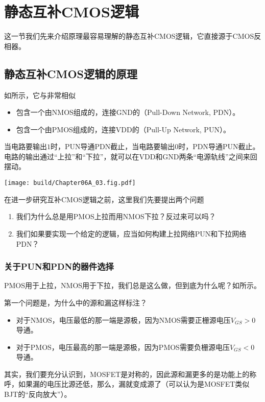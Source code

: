 \section{静态互补CMOS逻辑}
这一节我们先来介绍原理最容易理解的静态互补CMOS逻辑，它直接源于CMOS反相器。

\subsection{静态互补CMOS逻辑的原理}
如所示，它与非常相似
\begin{itemize}
    \item 包含一个由NMOS组成的，连接GND的（Pull-Down Network, PDN）。
    \item 包含一个由PMOS组成的，连接VDD的（Pull-Up Network, PUN）。
\end{itemize}
当电路要输出$1$时，PUN导通PDN截止，当电路要输出$0$时，PDN导通PUN截止。电路的输出通过“上拉”和“下拉”，就可以在VDD和GND两条“电源轨线”之间来回摆动。

\begin{Figure}[静态互补CMOS逻辑]
    \texttt{[image: build/Chapter06A\_03.fig.pdf]}
\end{Figure}


在进一步研究互补CMOS逻辑之前，这里我们先要提出两个问题
\begin{enumerate}
    \item 我们为什么总是用PMOS上拉而用NMOS下拉？反过来可以吗？
    \item 我们如果要实现一个给定的逻辑，应当如何构建上拉网络PUN和下拉网络PDN？
\end{enumerate}

\subsubsection{关于PUN和PDN的器件选择}
PMOS用于上拉，NMOS用于下拉，我们总是这么做，但到底为什么呢？如所示。

第一个问题是，为什么中的源和漏这样标注？
\begin{itemize}
    \item 对于NMOS，电压最低的那一端是源极，因为NMOS需要正栅源电压$V_{GS}>0$导通。
    \item 对于PMOS\hspace{0.1em}，电压最高的那一端是源极，因为PMOS\hspace{0.37em}需要负栅源电压$V_{GS}<0$导通。
\end{itemize}
其实，我们要充分认识到，MOSFET是对称的，因此源和漏更多的是功能上的称呼，如果漏的电压比源还低，那么，漏就变成源了（可以认为是MOSFET类似BJT的“反向放大”）。

